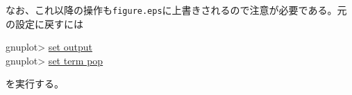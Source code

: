 {なお、これ以降の操作も{\tt figure.eps}に上書きされるので注意が必要である。元の設定に戻すには
\begin{commandline2}
gnuplot> \underline{set output} \\
gnuplot> \underline{set term pop}
\end{commandline2} \noindent
を実行する。



}
